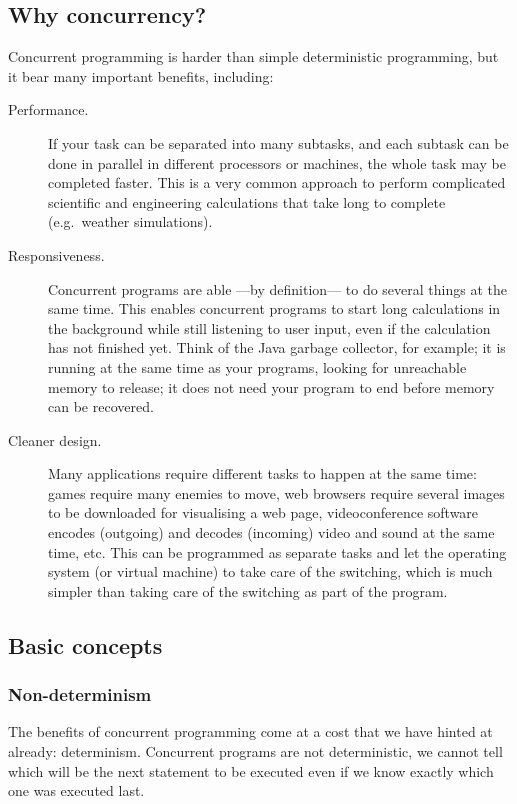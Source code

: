\subsection{Why concurrency?}
\label{sec:why-concurrency}

Concurrent programming is harder than simple deterministic
programming, but it bear many important benefits, including: 

\begin{description}
\item[Performance. ] If your task can be separated into many subtasks,
  and each subtask can be done in parallel in different processors or
  machines, the whole task may be completed faster. This is a very
  common approach to perform complicated scientific and engineering
  calculations that take long to complete (e.g.~weather simulations).
\item[Responsiveness. ] Concurrent programs are able ---by
  definition--- to do several things at the same time. This enables 
  concurrent programs to start long calculations in the background
  while still listening to user input, even if the calculation has not
  finished yet. Think of the Java garbage collector, for example; it is
  running at the same time as your programs, looking for unreachable
  memory to release; it does not need your program to end before
  memory can be recovered.
\item[Cleaner design. ] Many applications require different tasks to
  happen at the same time: games require many enemies to move, web
  browsers require several images to be downloaded for visualising a
  web page, videoconference software encodes (outgoing) and decodes
  (incoming) video and sound at the same time, etc. This can be
  programmed as separate tasks and let the operating system (or
  virtual machine) to take care of the switching, which is much
  simpler than taking care of the switching as part of the program. 
\end{description}

\subsection{Basic concepts}
\label{sec:basic-concepts}

\subsubsection{Non-determinism}
\label{sec:non-determinism}

The benefits of concurrent programming come at a cost that we have
hinted at already: determinism. Concurrent programs are not
deterministic, we cannot tell which will be the next statement to be
executed even if we know exactly which one was executed last. 

